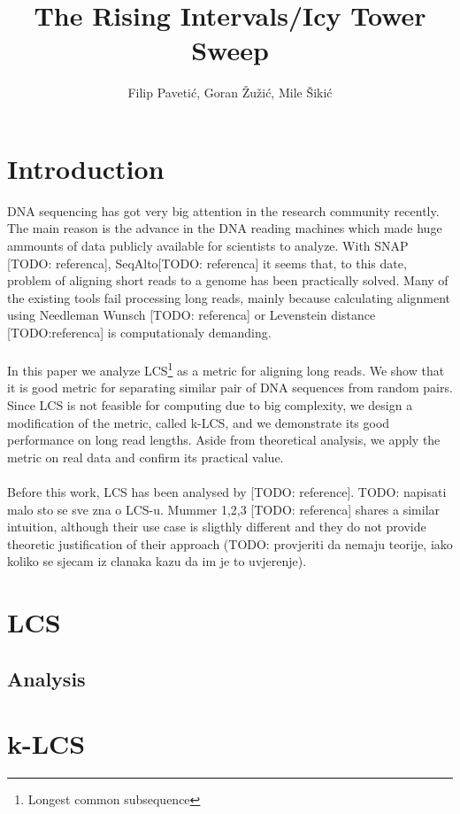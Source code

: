 \documentclass[11pt]{article} %
\title{The Rising Intervals/Icy Tower Sweep}
\author{Filip Paveti\'{c}, Goran \v{Z}u\v{z}i\'{c}, Mile \v{S}iki\'{c}}
\begin{document}
\maketitle

\section{Introduction}

DNA sequencing has got very big attention in the research community recently. The main reason is the advance in the DNA reading machines which made huge ammounts of data publicly available for scientists to analyze. With SNAP [TODO: referenca], SeqAlto[TODO: referenca] it seems that, to this date, problem of aligning short reads to a genome has been practically solved. Many of the existing tools fail processing long reads, mainly because calculating alignment using Needleman Wunsch [TODO: referenca] or Levenstein distance [TODO:referenca] is computationaly demanding.\\
\\
In this paper we analyze LCS\footnote{Longest common subsequence} as a metric for aligning long reads. We show that it is good metric for separating similar pair of DNA sequences from random pairs. Since LCS is not feasible for computing due to big complexity, we design a modification of the metric, called k-LCS, and we demonstrate its good performance on long read lengths. Aside from theoretical analysis, we apply the metric on real data and confirm its practical value.\\
\\
Before this work, LCS has been analysed by [TODO: reference]. TODO: napisati malo sto se sve zna o LCS-u. Mummer 1,2,3 [TODO: referenca] shares a similar intuition, although their use case is sligthly different and they do not provide theoretic justification of their approach (TODO: provjeriti da nemaju teorije, iako koliko se sjecam iz clanaka kazu da im je to uvjerenje).

\section{LCS}

\subsection{Analysis}

\section{k-LCS}
\end{document}

